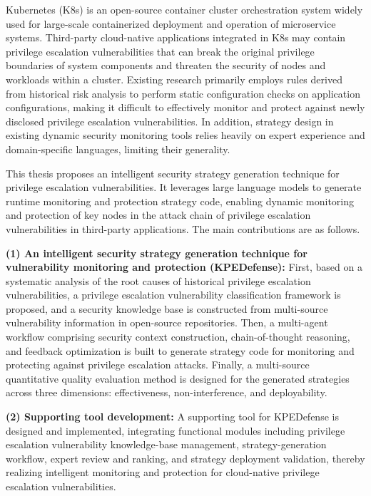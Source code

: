 \begin{EnglishAbstract}
    
Kubernetes (K8s) is an open-source container cluster orchestration system widely used for large-scale containerized deployment and operation of microservice systems. Third-party cloud-native applications integrated in K8s may contain privilege escalation vulnerabilities that can break the original privilege boundaries of system components and threaten the security of nodes and workloads within a cluster. Existing research primarily employs rules derived from historical risk analysis to perform static configuration checks on application configurations, making it difficult to effectively monitor and protect against newly disclosed privilege escalation vulnerabilities. In addition, strategy design in existing dynamic security monitoring tools relies heavily on expert experience and domain-specific languages, limiting their generality.

This thesis proposes an intelligent security strategy generation technique for privilege escalation vulnerabilities. It leverages large language models to generate runtime monitoring and protection strategy code, enabling dynamic monitoring and protection of key nodes in the attack chain of privilege escalation vulnerabilities in third-party applications. The main contributions are as follows.

\textbf{(1) An intelligent security strategy generation technique for vulnerability monitoring and protection (KPEDefense):} First, based on a systematic analysis of the root causes of historical privilege escalation vulnerabilities, a privilege escalation vulnerability classification framework is proposed, and a security knowledge base is constructed from multi-source vulnerability information in open-source repositories. Then, a multi-agent workflow comprising security context construction, chain-of-thought reasoning, and feedback optimization is built to generate strategy code for monitoring and protecting against privilege escalation attacks. Finally, a multi-source quantitative quality evaluation method is designed for the generated strategies across three dimensions: effectiveness, non-interference, and deployability.

\textbf{(2) Supporting tool development:} A supporting tool for KPEDefense is designed and implemented, integrating functional modules including privilege escalation vulnerability knowledge-base management, strategy-generation workflow, expert review and ranking, and strategy deployment validation, thereby realizing intelligent monitoring and protection for cloud-native privilege escalation vulnerabilities.


\end{EnglishAbstract}
